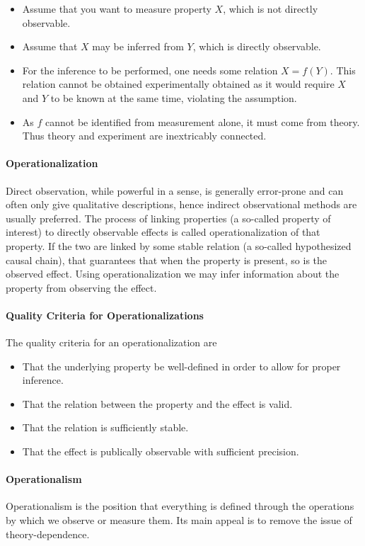 \begin{itemize}
	\item Assume that you want to measure property $X$, which is not directly observable.
	\item Assume that $X$ may be inferred from $Y$, which is directly observable.
	\item For the inference to be performed, one needs some relation $X = f(Y)$. This relation cannot be obtained experimentally obtained as it would require $X$ and $Y$ to be known at the same time, violating the assumption.
	\item As $f$ cannot be identified from measurement alone, it must come from theory. Thus theory and experiment are inextricably connected.
\end{itemize}

\paragraph{Operationalization}
Direct observation, while powerful in a sense, is generally error-prone and can often only give qualitative descriptions, hence indirect observational methods are usually preferred. The process of linking properties (a so-called property of interest) to directly observable effects is called operationalization of that property. If the two are linked by some stable relation (a so-called hypothesized causal chain), that guarantees that when the property is present, so is the observed effect. Using operationalization we may infer information about the property from observing the effect.

\paragraph{Quality Criteria for Operationalizations}
The quality criteria for an operationalization are
\begin{itemize}
	\item That the underlying property be well-defined in order to allow for proper inference.
	\item That the relation between the property and the effect is valid.
	\item That the relation is sufficiently stable.
	\item That the effect is publically observable with sufficient precision.
\end{itemize}

\paragraph{Operationalism}
Operationalism is the position that everything is defined through the operations by which  we observe or measure them. Its main appeal is to remove the issue of theory-dependence.

